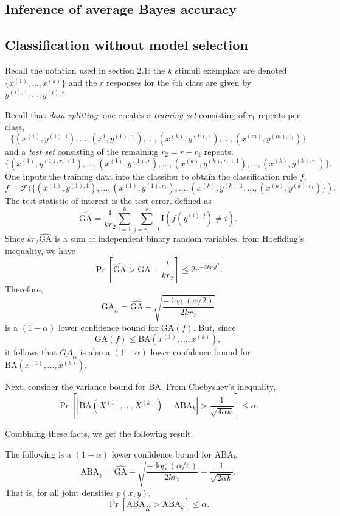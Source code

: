 \subsection{Inference of average Bayes accuracy}

\subsection{Classification without model selection}

Recall the notation used in section 2.1: the $k$ stimuli exemplars are
denoted $\{x^{(1)},\hdots, x^{(k)}\}$ and the $r$ responses for the
$i$th class are given by $y^{(i), 1},\hdots, y^{(i), r}$.

Recall that \emph{data-splitting}, one creates a \emph{training
set} consisting of $r_1$ repeats per class,
\[
\{(x^{(1)}, y^{(1),1}),\hdots, (x^1,y^{(1), r_1}), \hdots, (x^{(k)}, y^{(k),1}),\hdots, (x^{(m)},y^{(m), r_1})\}
\]
and a \emph{test set} consisting of the remaining $r_2 = r - r_1$ repeats.
\[
\{(x^{(1)}, y^{(1), r_1 + 1}),\hdots, (x^{(1)},y^{(1),r}), \hdots, (x^{(k)}, y^{(k), r_1 + 1}),\hdots, (x^{(k)},y^{(k),r_1})\}.
\]
One inputs the training data into the classifier to obtain the classification rule $f$,
\[
f = \mathcal{F}(\{(x^{(1)}, y^{(1),1}),\hdots, (x^{(1)},y^{(1),r_1}), \hdots, (x^{(k)}, y^{(k),1},\hdots, (x^{(k)},y^{(k), r_1})\}).
\]
The test statistic of interest is the test error,
defined as
\[
\widehat{\text{GA}} = \frac{1}{k r_2} \sum_{i=1}^k \sum_{j = r_1 + 1}^r \text{I}(f(y^{(i),j}) \neq i).
\]
Since $kr_2 \widehat{\text{GA}}$ is a sum of independent binary random
variables, from Hoeffding's inequality, we have
\[
\Pr[\widehat{\text{GA}} > \text{GA} + \frac{t}{kr_2}] \leq 2e^{-2kr_2t^2}.
\]
Therefore,
\[
\underline{\text{GA}}_\alpha = \widehat{\text{GA}} - \sqrt{\frac{-\log(\alpha/2)}{2kr_2}}
\]
is a $(1-\alpha)$ lower confidence bound for $\text{GA}(f)$.
But, since
\[
\text{GA}(f) \leq \text{BA}(x^{(1)},\hdots, x^{(k)}),
\]
it follows that $\underline{GA}_\alpha$ is also a $(1-\alpha)$ lower confidence bound for $\text{BA}(x^{(1)},\hdots, x^{(k)})$.

Next, consider the variance bound for $\text{BA}$.  From Chebyshev's inequality,
\[
\Pr[|\text{BA}(X^{(1)},\hdots, X^{(k)}) - \text{ABA}_k| > \frac{1}{\sqrt{4\alpha k}}] \leq \alpha.
\]

Combining these facts, we get the following result.

\begin{theorem}
The following is a $(1-\alpha)$ lower confidence bound for $\text{ABA}_k$:
\[
\underline{\text{ABA}}_k = \widehat{\text{GA}} - \sqrt{\frac{-\log(\alpha/4)}{2kr_2}} - \frac{1}{\sqrt{2\alpha k}}.
\]
That is, for all joint densities $p(x, y)$,
\[
\Pr[\underline{\text{ABA}}_K > \text{ABA}_k] \leq \alpha.
\]
\end{theorem}

